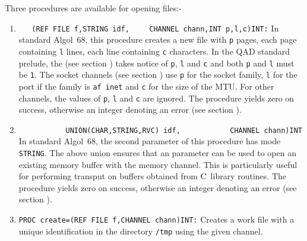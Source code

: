 Three procedures are available for opening files:-
\begin{enumerate}
\item {}\newline
      \verb|   (REF FILE f,STRING idf,|\newline
      \verb|    CHANNEL chann,INT p,l,c)INT:|\newline
In standard Algol~68, this procedure creates a new file with \verb|p|
pages, each page containing \verb|l| lines, each line containing
\verb|c| characters. In the QAD standard prelude, the
 (see section ) takes notice of
\verb|p|, \verb|l| and \verb|c| and both \verb|p| and \verb|l| must
be \verb|1|. The socket channels (see section
) use \verb|p| for the socket family, \verb|l| for
the port if the family is \verb|af inet| and \verb|c| for the size of
the MTU. For other channels, the values of \verb|p|, \verb|l| and
\verb|c| are ignored. The procedure yields zero on success, otherwise
an integer denoting an error (see section ).
\item {}\newline
      \verb|           UNION(CHAR,STRING,RVC) idf,|\newline
      \verb|           CHANNEL chann)INT|\newline
In standard Algol~68, the second parameter of this procedure has mode
\verb|STRING|. The above union ensures that an  parameter can
be used to open an existing memory buffer with the memory channel. This
is particularly useful for performing transput on buffers obtained from
C~library routines. The procedure yields zero on success, otherwise an
integer denoting an error (see section ).
\item \verb|PROC create=(REF FILE f,CHANNEL chann)INT:|\newline
Creates a work file with a unique identification in the directory
\verb|/tmp| using the given channel.
\end{enumerate}

